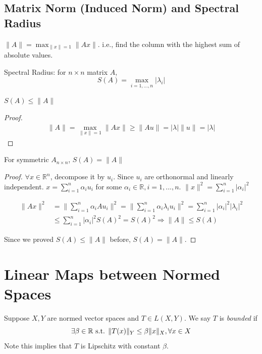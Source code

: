 \documentclass[11pt]{elegantbook}
\begin{document}
\section{Matrix Norm (Induced Norm) and Spectral Radius}
$\|A\|=\max _{\|x\|=1}\|A x\|$. i.e., find the column with the highest sum of absolute values.

Spectral Radius: for $n\times n$ matrix $A$, $$S(A)=\max_{i=1,...,n}|\lambda_i|$$

\begin{proposition}
$S(A)\leq \|A\|$
\end{proposition}
\begin{proof}
\begin{equation}
    \begin{aligned}
        \|A\|=\max _{\|x\|=1}\|A x\|\geq \|Au\|=|\lambda|\|u\|=|\lambda|
    \end{aligned}
    \nonumber
\end{equation}
\end{proof}

\begin{proposition}
    For symmetric $A_{n\times n}$, $S(A)= \|A\|$
\end{proposition}
\begin{proof}
\quad

$\forall x\in \mathbb{R}^n$, decompose it by $u_i$.
Since $u_i$ are orthonormal and linearly independent. $x=\sum_{i=1}^n\alpha_i u_i$ for some $\alpha_i\in \mathbb{R},i=1,...,n$. $\|x\|^2=\sum_{i=1}^n|\alpha_i|^2$

\begin{equation}
    \begin{aligned}
        \|Ax\|^2&=\|\sum_{i=1}^n\alpha_i A u_i\|^2=\|\sum_{i=1}^n\alpha_i \lambda_i u_i\|^2=\sum_{i=1}^n|\alpha_i|^2|\lambda_i|^2\\
        &\leq \sum_{i=1}^n|\alpha_i|^2S(A)^2=S(A)^2 \Rightarrow	\|A\|\leq S(A)
    \end{aligned}
    \nonumber
\end{equation}

Since we proved $S(A)\leq \|A\|$ before, $S(A)=\|A\|$.
\end{proof}


\chapter{Linear Maps between Normed Spaces}
\begin{definition}
    \normalfont
    Suppose $X, Y$ are normed vector spaces and $T \in L(X, Y)$. We say $T$ is \textit{bounded} if $$\exists \beta\in \mathbb{R} \textnormal{ s.t. }\|T(x)\|_Y\leq\beta\|x\|_X, \forall x\in X$$
    Note this implies that $T$ is Lipschitz with constant $\beta$.
\end{definition}
\end{document}
